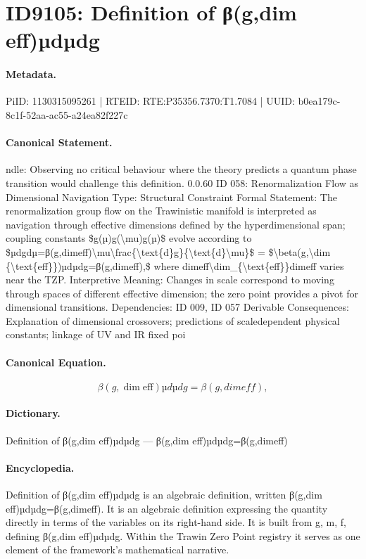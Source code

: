 \section*{ID9105: Definition of β(g,dim eff)µdµdg}
\paragraph{Metadata.}
PiID: 1130315095261 | RTEID: RTE:P35356.7370:T1.7084 | UUID: b0ea179c-8c1f-52aa-ac55-a24ea82f227c

\paragraph{Canonical Statement.}
ndle: Observing no critical behaviour where the theory predicts a quantum phase transition would challenge this definition. 0.0.60 ID 058: Renormalization Flow as Dimensional Navigation Type: Structural Constraint Formal Statement: The renormalization group flow on the Trawinistic manifold is interpreted as navigation through effective dimensions defined by the hyperdimensional span; coupling constants \$g(µ)g(\textbackslash{}mu)g(µ)\$ evolve according to \$µdgdµ=β(g,dimeff)\textbackslash{}mu\textbackslash{}frac\{\textbackslash{}text\{d\}g\}\{\textbackslash{}text\{d\}\textbackslash{}mu\}\$ = \$\textbackslash{}beta(g,\textbackslash{}dim \{\textbackslash{}text\{eff\}\})µdµdg=β(g,dimeff),\$ where dimeff\textbackslash{}dim\_\{\textbackslash{}text\{eff\}\}dimeff varies near the TZP. Interpretive Meaning: Changes in scale correspond to moving through spaces of different effective dimension; the zero point provides a pivot for dimensional transitions. Dependencies: ID 009, ID 057 Derivable Consequences: Explanation of dimensional crossovers; predictions of scaledependent physical constants; linkage of UV and IR fixed poi

\paragraph{Canonical Equation.}
\[
\beta(g,\dim {\text{eff}})µdµdg=β(g,dimeff),
\]

\paragraph{Dictionary.}
Definition of β(g,dim eff)µdµdg — β(g,dim eff)µdµdg=β(g,dimeff)

\paragraph{Encyclopedia.}
Definition of β(g,dim eff)µdµdg is an algebraic definition, written β(g,dim eff)µdµdg=β(g,dimeff). It is an algebraic definition expressing the quantity directly in terms of the variables on its right-hand side. It is built from g, m, f, defining β(g,dim eff)µdµdg. Within the Trawin Zero Point registry it serves as one element of the framework's mathematical narrative.
